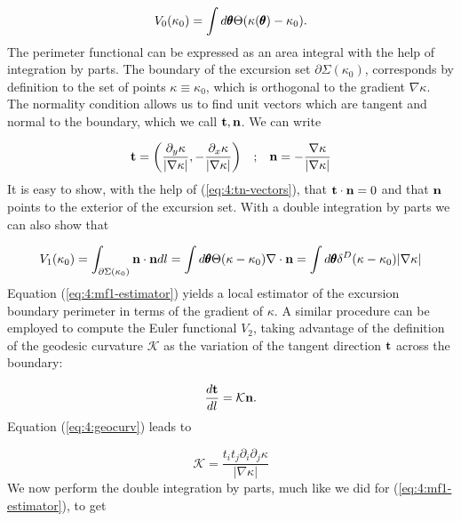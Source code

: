 \begin{equation}
\label{eq:4:mf0-estimator}
V_0(\kappa_0) = \int d\pmb{\theta} \Theta(\kappa(\pmb{\theta})-\kappa_0).
\end{equation} 
%
The perimeter functional can be expressed as an area integral with the help of integration by parts. The boundary of the excursion set $\partial \Sigma(\kappa_0)$, corresponds by definition to the set of points $\kappa\equiv\kappa_0$, which is orthogonal to the gradient $\nabla \kappa$. The normality condition allows us to find unit vectors which are tangent and normal to the boundary, which we call $\mathbf{t},\mathbf{n}$. We can write

\begin{equation}
\label{eq:4:tn-vectors}
\begin{matrix}
\displaystyle \mathbf{t} = \left(\frac{\partial_y \kappa}{\vert\nabla\kappa\vert},-\frac{\partial_x \kappa}{\vert\nabla\kappa\vert}\right) & ; & \displaystyle \mathbf{n} = -\frac{\nabla \kappa}{\vert\nabla\kappa\vert} 
\end{matrix}
\end{equation} 
%
It is easy to show, with the help of (\ref{eq:4:tn-vectors}), that $\mathbf{t}\cdot\mathbf{n}=0$ and that $\mathbf{n}$ points to the exterior of the excursion set. With a double integration by parts we can also show that

\begin{equation}
\label{eq:4:mf1-estimator}
V_1(\kappa_0) = \int_{\partial\Sigma(\kappa_0)}\mathbf{n}\cdot\mathbf{n}dl = \int d\pmb{\theta} \Theta(\kappa-\kappa_0) \nabla\cdot \mathbf{n} = \int d\pmb{\theta} \delta^D(\kappa-\kappa_0)\vert\nabla\kappa\vert
\end{equation}
%
Equation (\ref{eq:4:mf1-estimator}) yields a local estimator of the excursion boundary perimeter in terms of the gradient of $\kappa$. A similar procedure can be employed to compute the Euler functional $V_2$, taking advantage of the definition of the geodesic curvature $\mathcal{K}$ as the variation of the tangent direction $\mathbf{t}$ across the boundary:

\begin{equation}
\label{eq:4:geocurv}
\frac{d\mathbf{t}}{dl} = \mathcal{K}\mathbf{n}.
\end{equation}
%
Equation (\ref{eq:4:geocurv}) leads to 

\begin{equation}
\label{eq:4:geocurv-2}
\mathcal{K} = \frac{t_it_j\partial_i\partial_j\kappa}{\vert\nabla\kappa\vert}
\end{equation}
%
We now perform the double integration by parts, much like we did for (\ref{eq:4:mf1-estimator}), to get

